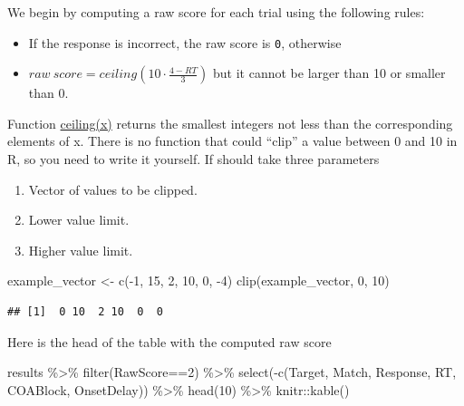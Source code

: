 \documentclass[
]{book}
\newenvironment{Shaded}{\begin{snugshade}}{\end{snugshade}}
\newcommand{\DecValTok}[1]{\textcolor[rgb]{0.00,0.00,0.81}{#1}}
\newcommand{\FunctionTok}[1]{\textcolor[rgb]{0.00,0.00,0.00}{#1}}
\newcommand{\NormalTok}[1]{#1}
\newcommand{\OtherTok}[1]{\textcolor[rgb]{0.56,0.35,0.01}{#1}}
\newcommand{\SpecialCharTok}[1]{\textcolor[rgb]{0.00,0.00,0.00}{#1}}
\providecommand{\tightlist}{%
  \setlength{\itemsep}{0pt}\setlength{\parskip}{0pt}}
\begin{document}
We begin by computing a raw score for each trial using the following rules:

\begin{itemize}
\tightlist
\item
  If the response is incorrect, the raw score is \texttt{0}, otherwise
\item
  \(raw~score = ceiling(10 \cdot \frac{4-RT}{3})\) but it cannot be larger than 10 or smaller than 0.
\end{itemize}

Function \href{https://stat.ethz.ch/R-manual/R-devel/library/base/html/Round.html}{ceiling(x)} returns the smallest integers not less than the corresponding elements of x. There is no function that could ``clip'' a value between 0 and 10 in R, so you need to write it yourself. If should take three parameters

\begin{enumerate}
\def\labelenumi{\arabic{enumi}.}
\tightlist
\item
  Vector of values to be clipped.
\item
  Lower value limit.
\item
  Higher value limit.
\end{enumerate}

\begin{Shaded}
\begin{Highlighting}[]
\NormalTok{example\_vector }\OtherTok{\textless{}{-}} \FunctionTok{c}\NormalTok{(}\SpecialCharTok{{-}}\DecValTok{1}\NormalTok{, }\DecValTok{15}\NormalTok{, }\DecValTok{2}\NormalTok{, }\DecValTok{10}\NormalTok{, }\DecValTok{0}\NormalTok{, }\SpecialCharTok{{-}}\DecValTok{4}\NormalTok{)}
\FunctionTok{clip}\NormalTok{(example\_vector, }\DecValTok{0}\NormalTok{, }\DecValTok{10}\NormalTok{)}
\end{Highlighting}
\end{Shaded}

\begin{verbatim}
## [1]  0 10  2 10  0  0
\end{verbatim}

Here is the head of the table with the computed raw score

\begin{Shaded}
\begin{Highlighting}[]
\NormalTok{results }\SpecialCharTok{\%\textgreater{}\%}
  \FunctionTok{filter}\NormalTok{(RawScore}\SpecialCharTok{==}\DecValTok{2}\NormalTok{) }\SpecialCharTok{\%\textgreater{}\%}
  \FunctionTok{select}\NormalTok{(}\SpecialCharTok{{-}}\FunctionTok{c}\NormalTok{(Target, Match, Response, RT, COABlock, OnsetDelay)) }\SpecialCharTok{\%\textgreater{}\%}
  \FunctionTok{head}\NormalTok{(}\DecValTok{10}\NormalTok{) }\SpecialCharTok{\%\textgreater{}\%}
\NormalTok{  knitr}\SpecialCharTok{::}\FunctionTok{kable}\NormalTok{()}
\end{Highlighting}
\end{Shaded}
\end{document}
